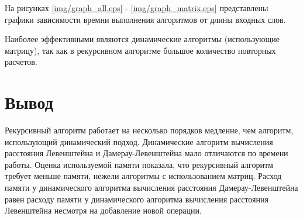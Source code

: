 На рисунках \ref{img/graph_all.eps} - \ref{img/graph_matrix.eps} представлены графики зависимости времни выполнения алгоритмов от длины входных слов.

Наиболее эффективными являются динамические алгоритмы (использующие матрицу), так как в рекурсивном алгоритме большое количество повторных расчетов.

\section*{Вывод}
Рекурсивный алгоритм работает на несколько порядков медленне, чем алгоритм, использующий динамический подход. Динамические алгоритм вычисления расстояния Левенштейна и Дамерау-Левенштейна мало отличаются по времени работы. Оценка используемой памяти показала, что рекурсивный алгоритм требует меньше памяти, нежели алгоритмы с использованием матриц. Расход памяти у динамического алгоритма вычисления расстояния Дамерау-Левенштейна равен расходу памяти у динамического алгоритма вычисления расстояния Левенштейна несмотря на добавление новой операции.
